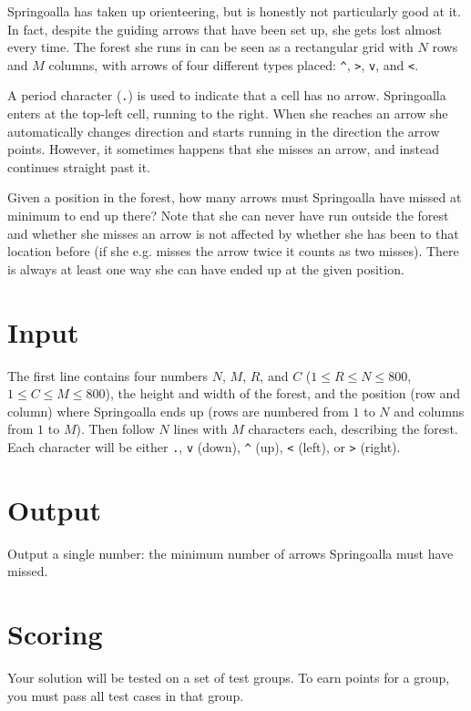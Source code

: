 Springoalla has taken up orienteering, but is honestly not
particularly good at it. In fact, despite the guiding arrows
that have been set up, she gets lost almost every time. The forest she runs
in can be seen as a rectangular grid with $N$ rows and $M$ columns,
with arrows of four different types placed: \verb+^+, \texttt{>},
\texttt{v}, and \texttt{<}.

A period character (\texttt{.}) is used to indicate that a cell has no
arrow. Springoalla
enters at the top-left cell, running to the right. When she
reaches an arrow she automatically changes direction and starts running
in the direction the arrow points. However, it sometimes happens that she misses an
arrow, and instead continues straight past it.

Given a position in the forest, how many arrows must Springoalla have
missed at minimum to end up there? Note that she can never have run outside
the forest and whether she misses an arrow is not affected by whether she has been
to that location before (if she e.g. misses the arrow twice it counts
as two misses). There is always at least one way she can have ended up at the given position.

\section*{Input}

The first line contains four numbers $N$, $M$, $R$, and $C$ ($1 \leq R \leq N \leq 800$, $1 \leq C \leq M \leq 800$), the height and width of the forest, and the position (row and column) where Springoalla ends
up (rows are numbered from $1$ to $N$ and columns from $1$ to
$M$). Then follow $N$ lines with $M$ characters each, describing the forest.
Each character will be either \texttt{.}, \texttt{v} (down),
\verb+^+ (up), \texttt{<} (left), or \texttt{>} (right).

\section*{Output}
Output a single number: the minimum number of arrows Springoalla must have missed.

\section*{Scoring}
Your solution will be tested on a set of test groups.
To earn points for a group, you must pass all test cases in that group.

